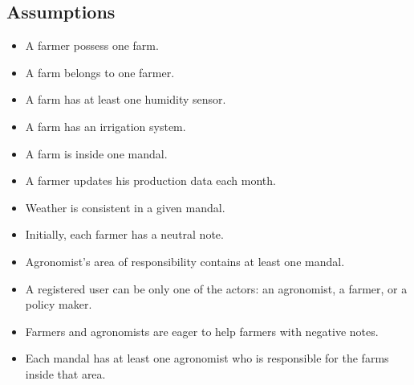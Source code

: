 \subsection{Assumptions}
\begin{itemize}
    \item A farmer possess one farm.
    \item A farm belongs to one farmer.
    \item A farm has at least one humidity sensor.
    \item A farm has an irrigation system.
    \item A farm is inside one mandal.
    \item A farmer updates his production data each month.
    \item Weather is consistent in a given mandal.
    \item Initially, each farmer has a neutral note.
    \item Agronomist's area of responsibility contains at least one mandal.
    \item A registered user can be only one of the actors: an agronomist, a farmer, or a policy maker.
    \item Farmers and agronomists are eager to help farmers with negative notes.
    \item Each mandal has at least one agronomist who is responsible for the farms inside that area.
\end{itemize}